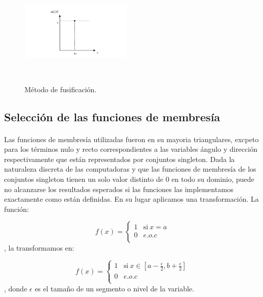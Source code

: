 \documentclass[a4paper,10pt]{article}
\begin{document}
\begin{figure}[htb]%
	\begin{center}		
		\includegraphics[width=200px, height=200px]{images/fuzzification.jpg}
	\end{center}
	\caption{Método de fusificación.\label{fig:fuzzification}}%
\end{figure}


\subsection{Selección de las funciones de membresía}\label{sub:membership_functions}
	\paragraph{} Las funciones de membresía utilizadas fueron en su mayoria triangulares, excpeto para los términos nulo y recto correspondientes
	a las variables ángulo y dirección respectivamente que están representados por conjuntos singleton. Dada la naturaleza discreta de las computadoras y que las funciones 		de membresía de los  conjuntos singleton tienen un solo valor distinto de 0 en todo su dominio, puede no alcanzarse los resultados esperados si las funciones las 				implementamos exactamente como están definidas. En su lugar aplicamos una transformación. La función:

	\begin{equation}
		\label{eq:singleton}
		f(x) = \left\{
		\begin{array}{lc}
			1 & \mathrm{si\ } x = a \\
			0 & e.o.c \\
		\end{array}
		\right.
	\end{equation},   
	la transformamos en:
	   
	\begin{equation}
		\label{eq:trapezoidal}
		f(x) = \left\{
			\begin{array}{lc}
			 	1 & \mathrm{si\ } x \in  [a - \frac{\epsilon}{2}, b + \frac{\epsilon}{2}] \\
			 	0 & e.o.c \\
		      \end{array}
		     \right.
	\end{equation},   
	donde $\epsilon$ es el tamaño de un segmento o nivel de la variable.
	   
\end{document}
